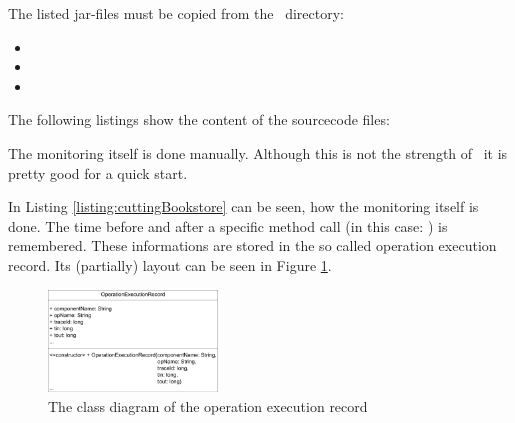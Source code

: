 		The listed jar-files must be copied from the \Kieker\  directory:
		\begin{itemize}
			\item {}
			\item {}
			\item {}
		\end{itemize}
		The following listings show the content of the sourcecode files:
		\setJavaCodeListing       
		
		
		

		

		The monitoring itself is done manually. Although this is not the strength of \Kieker\ it is pretty good for a quick start. 

		
		
		In Listing \ref{listing:cuttingBookstore}  can be seen, how the monitoring itself is done. The time before and after a specific method call (in this case: ) is remembered. These informations are stored in the so called operation execution record. Its (partially) layout can be seen in Figure \ref{Figure:OperationExecutionRecordClassDiagram}.

		\begin{figure}[H]
			\begin{centering}
				\includegraphics[width=0.4\textwidth]{images/OpExRecClassDiagram}
				\caption{The class diagram of the operation execution record}
				\label{Figure:OperationExecutionRecordClassDiagram}
			\end{centering}
		\end{figure}

